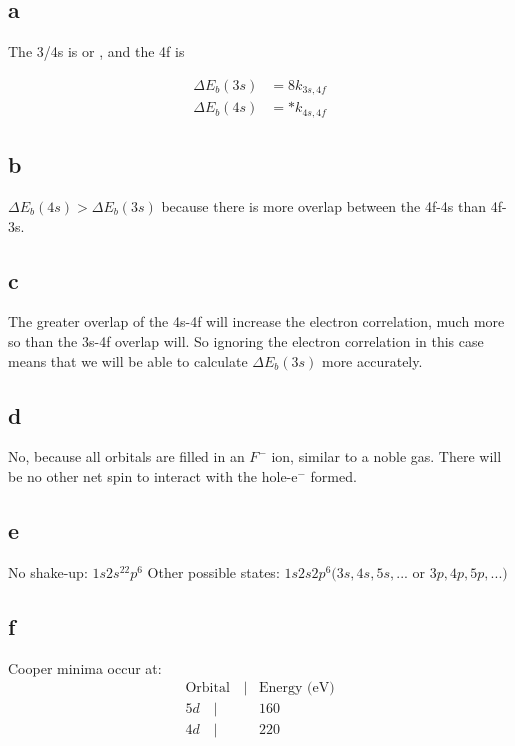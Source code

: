 \documentclass[12pt]{article}
\renewcommand{\=}[1]{\stackrel{#1}{=}} %
\theoremstyle{definition}
\theoremstyle{remark}
\begin{document}
\subsection*{a}
The 3/4s is \textuparrow or \textdownarrow , and the 4f is \textuparrow\textuparrow\textuparrow\textuparrow\textuparrow\textuparrow\textuparrow

\begin{align*}
\Delta E_b(3s) &= 8k_{3s, 4f}\\[3mm]
\Delta E_b(4s) &= *k_{4s, 4f}
\end{align*}

\subsection*{b}
$\Delta E_b(4s) > \Delta E_b(3s)$ because there is more overlap between the 4f-4s than 4f-3s.

\subsection*{c}
The greater overlap of the 4s-4f will increase the electron correlation, much more so than the 3s-4f overlap will. So ignoring the electron correlation in this case means that we will be able to calculate $\Delta E_b(3s)$ more accurately. 

\subsection*{d}
No, because all orbitals are filled in an $F^-$ ion, similar to a noble gas. There will be no other net spin to interact with the hole-e$^-$ formed.

\subsection*{e}
No shake-up: $1s2s^22p^6$
\newline
Other possible states: $1s2s2p^6(3s,4s,5s,...$ or $3p, 4p, 5p,...)$

\subsection*{f}
Cooper minima occur at:
\begin{align*}
\text{Orbital} \quad | & \text{Energy (eV)}\\
5d \quad | & 160\\
4d \quad | & 220
\end{align*}
\end{document}
